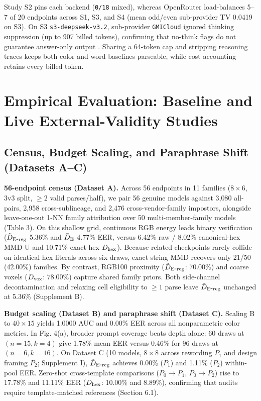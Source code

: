 Study S2 pins each backend (\texttt{0/\allowbreak{}18} mixed), whereas OpenRouter load-balances 5--7 of 20 endpoints across S1, S3, and S4 (mean odd/\allowbreak{}even sub-provider TV 0.0419 on S3). On S3 \texttt{s3-\allowbreak{}deepseek-\allowbreak{}v3.\allowbreak{}2}, sub-provider \texttt{GMICloud} ignored thinking suppression (up to 907 billed tokens), confirming that no-think flags do not guarantee answer-only output \cite{ref24}. Sharing a 64-token cap and stripping reasoning traces keeps both color and word baselines parseable, while cost accounting retains every billed token.


\section{Empirical Evaluation: Baseline and Live External-Validity Studies}

\subsection{Census, Budget Scaling, and Paraphrase Shift (Datasets A--C)}

\textbf{56-endpoint census (Dataset A).} Across 56 endpoints in 11 families ($8\times 6$, 3v3 split, $\ge 2$ valid parses/half), we pair 56 genuine models against 3,080 all-pairs, 2,958 cross-sublineage, and 2,476 cross-vendor-family impostors, alongside leave-one-out 1-NN family attribution over 50 multi-member-family models (Table 3). On this shallow grid, continuous RGB energy leads binary verification ($\tilde D_{\mathrm{E\mbox{-}reg}}{}$ 5.36\% and $\bar D_{\mathrm E}{}$ 4.77\% EER, versus 6.42\% raw / 8.02\% canonical-hex MMD-U and 10.71\% exact-hex $D_{\mathrm{hex}}{}$). Because related checkpoints rarely collide on identical hex literals across six draws, exact string MMD recovers only 21/50 (42.00\%) families. By contrast, RGB100 proximity ($\tilde D_{\mathrm{E\mbox{-}reg}}{}$: 70.00\%) and coarse voxels ($D_{\mathrm{vox}}{}$: 78.00\%) capture shared family priors. Both side-channel decontamination and relaxing cell eligibility to $\ge 1$ parse leave $\tilde D_{\mathrm{E\mbox{-}reg}}{}$ unchanged at 5.36\% (Supplement B).


\textbf{Budget scaling (Dataset B) and paraphrase shift (Dataset C).} Scaling B to $40\times 15$ yields 1.0000 AUC and 0.00\% EER across all nonparametric color metrics. In Fig. 4(a), broader prompt coverage beats depth alone: 60 draws at $(n=15,k=4)$ give 1.78\% mean EER versus 0.46\% for 96 draws at $(n=6,k=16)$. On Dataset C (10 models, $8\times 8$ across rewording $P_1$ and design framing $P_2$; Supplement I), $\tilde D_{\mathrm{E\mbox{-}reg}}{}$ achieves 0.00\% ($P_1$) and 1.11\% ($P_2$) within-pool EER. Zero-shot cross-template comparisons ($P_0\to P_1$, $P_0\to P_2$) rise to 17.78\% and 11.11\% EER ($D_{\mathrm{hex}}{}$: 10.00\% and 8.89\%), confirming that audits require template-matched references (Section 6.1).


